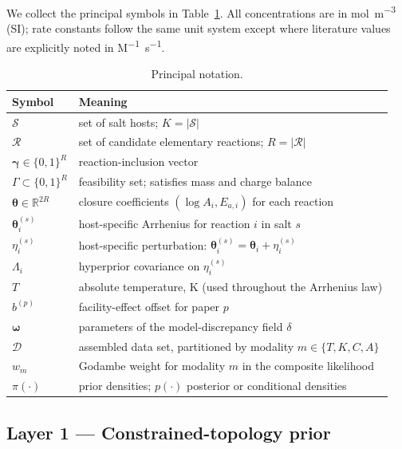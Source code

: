 \documentclass[12pt]{article}
\theoremstyle{plain}
\theoremstyle{definition}
\theoremstyle{remark}
\newcommand{\R}{\mathbb{R}}
\begin{document}
We collect the principal symbols in Table~\ref{tab:notation}.  All
concentrations are in \si{mol\per m^3} (SI); rate constants follow the same
unit system except where literature values are explicitly noted in
\si{M^{-1}.s^{-1}}.

\begin{table}[ht]\centering
\caption{Principal notation.}\label{tab:notation}
\small
\begin{tabular}{lp{}}
\toprule
Symbol & Meaning \\
\midrule
$\mathcal{S}$ & set of salt hosts; $K = |\mathcal{S}|$ \\
$\mathcal{R}$ & set of candidate elementary reactions; $R = |\mathcal{R}|$ \\
$\boldsymbol\gamma \in \{0,1\}^R$ & reaction-inclusion vector \\
$\Gamma \subset \{0,1\}^R$ & feasibility set; satisfies mass and charge balance \\
$\boldsymbol\theta \in \R^{2R}$ & closure coefficients $(\log A_i, E_{a,i})$ for each reaction \\
$\boldsymbol\theta_i^{(s)}$ & host-specific Arrhenius for reaction $i$ in salt $s$ \\
$\eta_i^{(s)}$ & host-specific perturbation: $\boldsymbol\theta_i^{(s)} = \boldsymbol\theta_i + \eta_i^{(s)}$ \\
$\Lambda_i$ & hyperprior covariance on $\eta_i^{(s)}$ \\
$T$ & absolute temperature, K (used throughout the Arrhenius law) \\
$b^{(p)}$ & facility-effect offset for paper $p$ \\
$\boldsymbol\omega$ & parameters of the model-discrepancy field $\delta$ \\
$\mathcal{D}$ & assembled data set, partitioned by modality $m\in\{T,K,C,A\}$ \\
$w_m$ & Godambe weight for modality $m$ in the composite likelihood \\
$\pi(\cdot)$ & prior densities; $p(\cdot)$ posterior or conditional densities \\
\bottomrule
\end{tabular}
\end{table}

\subsection{Layer 1 --- Constrained-topology prior}\label{sec:framework:topology}
\end{document}
